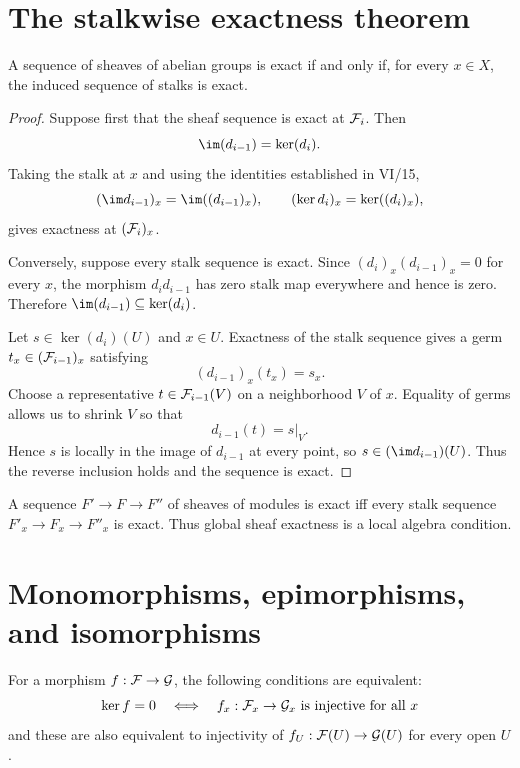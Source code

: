 \section{The stalkwise exactness theorem}

\begin{theorem}\label{thm:vi16-stalkwise-exact}
A sequence of sheaves of abelian groups is exact if and only if, for every $x\in X$, the
induced sequence of stalks is exact.
\end{theorem}

\begin{proof}
Suppose first that the sheaf sequence is exact at $\mathcal F_i$.  Then
\[
\im(d_{i-1})=\ker(d_i).
\]
Taking the stalk at $x$ and using the identities established in VI/15,
\[
(\im d_{i-1})_x=\im((d_{i-1})_x),\qquad
(\ker d_i)_x=\ker((d_i)_x),
\]
gives exactness at $(\mathcal F_i)_x$.

Conversely, suppose every stalk sequence is exact.  Since
$(d_i)_x(d_{i-1})_x=0$ for every $x$, the morphism $d_i d_{i-1}$ has zero stalk map
everywhere and hence is zero.  Therefore
$\im(d_{i-1})\subseteq\ker(d_i)$.

Let $s\in\ker(d_i)(U)$ and $x\in U$.  Exactness of the stalk sequence gives a germ
$t_x\in(\mathcal F_{i-1})_x$ satisfying
\[
(d_{i-1})_x(t_x)=s_x.
\]
Choose a representative $t\in\mathcal F_{i-1}(V)$ on a neighborhood $V$ of $x$.  Equality of germs
allows us to shrink $V$ so that
\[
d_{i-1}(t)=s|_V.
\]
Hence $s$ is locally in the image of $d_{i-1}$ at every point, so
$s\in(\im d_{i-1})(U)$.  Thus the reverse inclusion holds and the sequence is exact.
\end{proof}



\begin{example}\label{ex:vi16-expand-01}
A sequence $F'\to F\to F''$ of sheaves of modules is exact iff every stalk sequence $F'_x\to F_x\to F''_x$ is exact.  Thus global sheaf exactness is a local algebra condition.
\end{example}
\section{Monomorphisms, epimorphisms, and isomorphisms}

For a morphism $f:\mathcal F\to\mathcal G$, the following conditions are equivalent:
\[
\ker f=0
\quad\Longleftrightarrow\quad
f_x:\mathcal F_x\to\mathcal G_x\text{ is injective for all }x
\]
and these are also equivalent to injectivity of
$f_U:\mathcal F(U)\to\mathcal G(U)$ for every open $U$.

